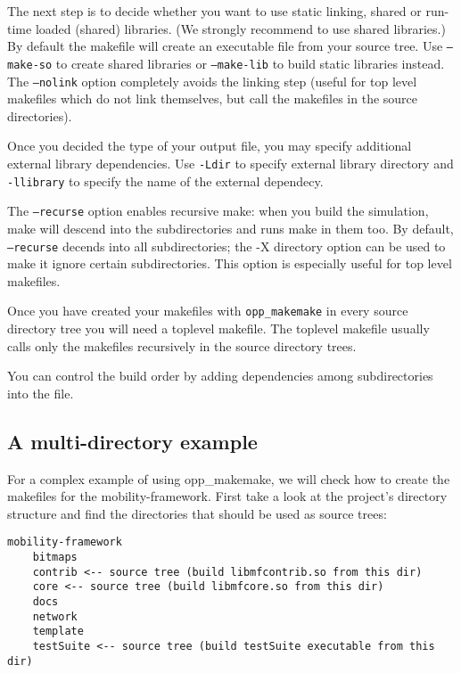 The next step is to decide whether you want to use static linking,
shared or run-time loaded (shared) libraries. (We strongly
recommend to use shared libraries.) By default the makefile will create an executable
file from your source tree. Use \texttt{--make-so} to create shared libraries
or \texttt{--make-lib} to build static libraries instead. The \texttt{--nolink}
option completely avoids the linking step (useful for top level makefiles which do
not link themselves, but call the makefiles in the source directories).

Once you decided the type of your output file, you may specify additional external library
dependencies. Use \texttt{-Ldir} to specify external library directory and \texttt{-llibrary}
to specify the name of the external dependecy.

The \texttt{--recurse} option enables recursive make: when you build the simulation, make
will descend into the subdirectories and runs make in them too.
By default, \texttt{--recurse} decends into all subdirectories; the -X directory option
can be used to make it ignore certain subdirectories. This option is especially useful
for top level makefiles.

Once you have created your makefiles with \texttt{opp\_makemake} in every source directory tree
you will need a toplevel makefile. The toplevel makefile usually calls only the makefiles
recursively in the source directory trees.

You can control the build order by adding dependencies among subdirectories
into the  file.

\subsection{A multi-directory example}

For a complex example of using opp\_makemake, we will check how to create
the makefiles for the mobility-framework. First take a look at the
project's directory structure and find the directories that should be used as
source trees:

\begin{verbatim}
mobility-framework
    bitmaps
    contrib <-- source tree (build libmfcontrib.so from this dir)
    core <-- source tree (build libmfcore.so from this dir)
    docs
    network
    template
    testSuite <-- source tree (build testSuite executable from this dir)
\end{verbatim}

